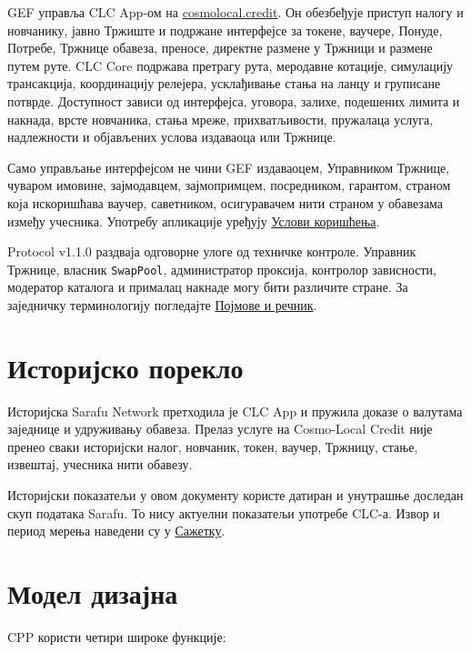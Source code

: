 \documentclass[11pt]{article}
\begin{document}
GEF управља CLC App-ом на \href{https://cosmolocal.credit}{cosmolocal.credit}. Он обезбеђује приступ налогу и новчанику, јавно Тржиште и подржане интерфејсе за токене, ваучере, Понуде, Потребе, Тржнице обавеза, преносе, директне размене у Тржници и размене путем руте. CLC Core подржава претрагу рута, меродавне котације, симулацију трансакција, координацију релејера, усклађивање стања на ланцу и груписане потврде. Доступност зависи од интерфејса, уговора, залихе, подешених лимита и накнада, врсте новчаника, стања мреже, прихватљивости, пружалаца услуга, надлежности и објављених услова издаваоца или Тржнице.

Само управљање интерфејсом не чини GEF издаваоцем, Управником Тржнице, чуваром имовине, зајмодавцем, зајмопримцем, посредником, гарантом, страном која искоришћава ваучер, саветником, осигуравачем нити страном у обавезама између учесника. Употребу апликације уређују \href{https://docs.cosmolocal.credit/sr/governance/terms}{Услови коришћења}.

Protocol v1.1.0 раздваја одговорне улоге од техничке контроле. Управник Тржнице, власник \texttt{SwapPool}, администратор проксија, контролор зависности, модератор каталога и прималац накнаде могу бити различите стране. За заједничку терминологију погледајте \href{https://docs.cosmolocal.credit/sr/introduction/concepts}{Појмове и речник}.

\section*{Историјско порекло}

Историјска Sarafu Network претходила је CLC App и пружила доказе о валутама заједнице и удруживању обавеза. Прелаз услуге на Cosmo-Local Credit није пренео сваки историјски налог, новчаник, токен, ваучер, Тржницу, стање, извештај, учесника нити обавезу.

Историјски показатељи у овом документу користе датиран и унутрашње доследан скуп података Sarafu. То нису актуелни показатељи употребе CLC-а. Извор и период мерења наведени су у \href{https://docs.cosmolocal.credit/sr/white-paper/executive-summary}{Сажетку}.

\section*{Модел дизајна}

CPP користи четири широке функције:
\end{document}
